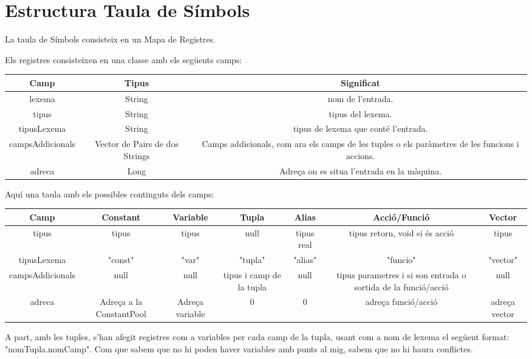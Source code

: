 \documentclass[11pt,a4paper,twoside]{article}
\begin{document}
\section{Estructura Taula de Símbols}
La taula de Símbols consisteix en un Mapa de Registres.

Els registres consisteixen en una classe amb els següents camps:

\begin{center}
  \begin{tabular}{ |c|c|c|}
    \hline
    Camp & Tipus & Significat \\
   \hline
    lexema & String & nom de l'entrada. \\
    tipus & String & tipus del lexema. \\
    tipusLexema & String & tipus de lexema que conté l'entrada. \\
    campsAddicionals & Vector de Pairs de dos Strings& Camps addicionals, com ara els camps de les tuples o els paràmetres de les funcions i accions. \\
    adreca & Long & Adreça on es situa l'entrada en la màquina. \\
   \hline
  \end{tabular}
  \end{center}

 Aquí una taula amb els possibles continguts dels camps:

 \begin{center}
  \begin{tabular}{ |c|c|c|c|c|c|c|}
    \hline
    Camp & Constant & Variable & Tupla & Alias & Acció/Funció & Vector\\
   \hline
   tipus & tipus & tipus & null & tipus real & tipus retorn, void si és acció & tipus \\
   tipusLexema & "const" & "var" & "tupla" & "alias" & "funcio" & "vector" \\
   campsAddicionals & null & null & tipus i camp de la tupla & null & tipus parametres i si son entrada o sortida de la funció/acció & null \\
   adreca & Adreça a la ConstantPool & Adreça variable & 0 & 0 & adreça funció/acció & adreça vector \\
   \hline
  \end{tabular}
  \end{center}

  A part, amb les tuples, s'han afegit registres com a variables per cada camp de la tupla, usant com a nom de lexema el següent format: "nomTupla.nomCamp". Com que sabem que no hi poden haver variables amb punts al mig, sabem que no hi haura conflictes.
\end{document}
